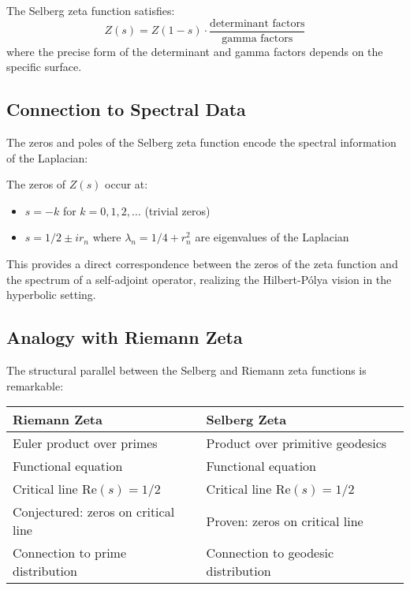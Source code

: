 \begin{theorem}
\label{thm:selberg_functional}
The Selberg zeta function satisfies:
$$Z(s) = Z(1-s) \cdot \frac{\text{determinant factors}}{\text{gamma factors}}$$
where the precise form of the determinant and gamma factors depends on the specific surface.
\end{theorem}

\subsection{Connection to Spectral Data}

The zeros and poles of the Selberg zeta function encode the spectral information of the Laplacian:

\begin{theorem}
\label{thm:selberg_zeros}
The zeros of $Z(s)$ occur at:
\begin{itemize}
\item $s = -k$ for $k = 0, 1, 2, \ldots$ (trivial zeros)
\item $s = 1/2 \pm ir_n$ where $\lambda_n = 1/4 + r_n^2$ are eigenvalues of the Laplacian
\end{itemize}
\end{theorem}

This provides a direct correspondence between the zeros of the zeta function and the spectrum of a self-adjoint operator, realizing the Hilbert-Pólya vision in the hyperbolic setting.

\subsection{Analogy with Riemann Zeta}

The structural parallel between the Selberg and Riemann zeta functions is remarkable:

\begin{center}
\begin{tabular}{|l|l|}
\hline
\textbf{Riemann Zeta} & \textbf{Selberg Zeta} \\
\hline
Euler product over primes & Product over primitive geodesics \\
Functional equation & Functional equation \\
Critical line $\text{Re}(s) = 1/2$ & Critical line $\text{Re}(s) = 1/2$ \\
Conjectured: zeros on critical line & Proven: zeros on critical line \\
Connection to prime distribution & Connection to geodesic distribution \\
\hline
\end{tabular}
\end{center}

